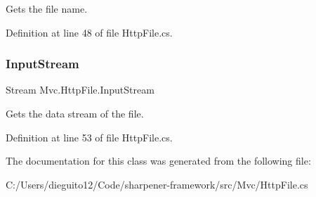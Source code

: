 Gets the file name. 



Definition at line 48 of file Http\+File.\+cs.

\mbox{\label{class_mvc_1_1_http_file_aafd93d89d0f3dd9526623810bb55a989}} 
\subsubsection{\texorpdfstring{Input\+Stream}{InputStream}}
{\footnotesize\ttfamily Stream Mvc.\+Http\+File.\+Input\+Stream\hspace{0.3cm}{\ttfamily [get]}}



Gets the data stream of the file. 



Definition at line 53 of file Http\+File.\+cs.



The documentation for this class was generated from the following file\+:\begin{DoxyCompactItemize}
\item 
C\+:/\+Users/dieguito12/\+Code/sharpener-\/framework/src/\+Mvc/Http\+File.\+cs\end{DoxyCompactItemize}
